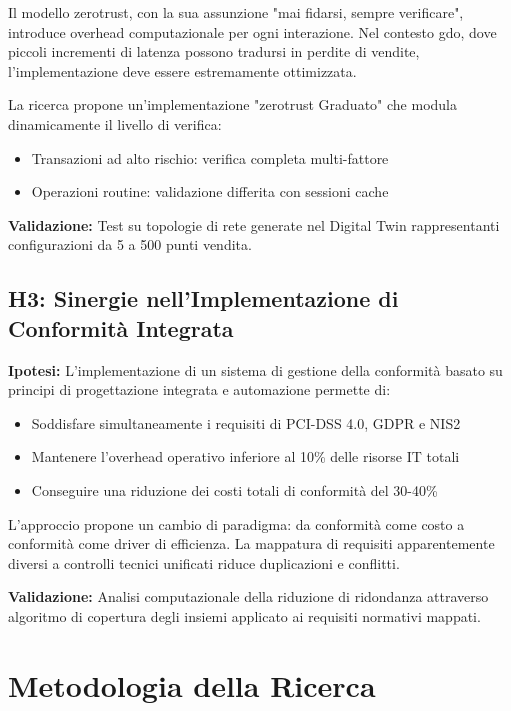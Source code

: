 Il modello \gls{zerotrust}, con la sua assunzione "mai fidarsi, sempre verificare", introduce overhead computazionale per ogni interazione. Nel contesto \gls{gdo}, dove piccoli incrementi di latenza possono tradursi in perdite di vendite, l'implementazione deve essere estremamente ottimizzata.

La ricerca propone un'implementazione "\gls{zerotrust} Graduato" che modula dinamicamente il livello di verifica:
\begin{itemize}
\item Transazioni ad alto rischio: verifica completa multi-fattore
\item Operazioni routine: validazione differita con sessioni cache
\end{itemize}

\textbf{Validazione:} Test su topologie di rete generate nel Digital Twin rappresentanti configurazioni da 5 a 500 punti vendita.

\subsection{\texorpdfstring{\textbf{H3: Sinergie nell'Implementazione di Conformità Integrata}}{1.4.3 - H3: Sinergie nell'Implementazione di Conformità Integrata}}
\label{subsec:h3}

\textbf{Ipotesi:} L'implementazione di un sistema di gestione della conformità basato su principi di progettazione integrata e automazione permette di:
\begin{itemize}
\item Soddisfare simultaneamente i requisiti di PCI-DSS 4.0, GDPR e NIS2
\item Mantenere l'overhead operativo inferiore al 10\% delle risorse IT totali
\item Conseguire una riduzione dei costi totali di conformità del 30-40\%
\end{itemize}

L'approccio propone un cambio di paradigma: da conformità come costo a conformità come driver di efficienza. La mappatura di requisiti apparentemente diversi a controlli tecnici unificati riduce duplicazioni e conflitti.

\textbf{Validazione:} Analisi computazionale della riduzione di ridondanza attraverso algoritmo di copertura degli insiemi applicato ai requisiti normativi mappati.

\section{\texorpdfstring{\textbf{Metodologia della Ricerca}}{1.5 - Metodologia della Ricerca}}
\label{sec:metodologia}

